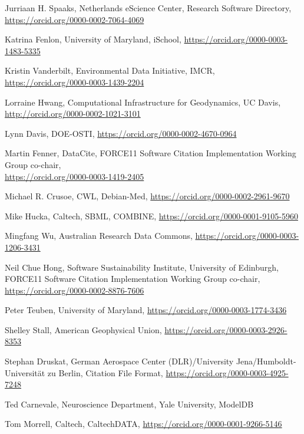 \documentclass[11pt]{article}
\begin{document}
\begin{spacing}{0.86}
Jurriaan H. Spaaks, Netherlands eScience Center, Research Software
Directory,\\
\url{https://orcid.org/0000-0002-7064-4069}

Katrina Fenlon, University of Maryland, iSchool,
\url{https://orcid.org/0000-0003-1483-5335}

Kristin Vanderbilt, Environmental Data Initiative, IMCR,
\url{https://orcid.org/0000-0003-1439-2204}

Lorraine Hwang, Computational Infrastructure for Geodynamics, UC Davis,\\
\url{http://orcid.org/0000-0002-1021-3101}

Lynn Davis, DOE-OSTI, \url{https://orcid.org/0000-0002-4670-0964}

Martin Fenner, DataCite, FORCE11 Software Citation Implementation
Working Group co-chair,\\
\url{https://orcid.org/0000-0003-1419-2405}

Michael R. Crusoe, CWL, Debian-Med,
\url{https://orcid.org/0000-0002-2961-9670}

Mike Hucka, Caltech, SBML, COMBINE,
\url{https://orcid.org/0000-0001-9105-5960}

Mingfang Wu, Australian Research Data Commons,
\url{https://orcid.org/0000-0003-1206-3431}

Neil Chue Hong, Software Sustainability Institute, University of Edinburgh, FORCE11 Software Citation Implementation Working Group co-chair, 
\url{https://orcid.org/0000-0002-8876-7606}

Peter Teuben, University of Maryland,
\url{https://orcid.org/0000-0003-1774-3436}

Shelley Stall, American Geophysical Union,
\url{https://orcid.org/0000-0003-2926-8353}

Stephan Druskat, German Aerospace Center (DLR)/University
Jena/Humboldt-Universität zu Berlin, Citation File Format,
\url{https://orcid.org/0000-0003-4925-7248}

Ted Carnevale, Neuroscience Department, Yale University, ModelDB

Tom Morrell, Caltech, CaltechDATA,
\url{https://orcid.org/0000-0001-9266-5146}

\end{spacing}
\end{document}
